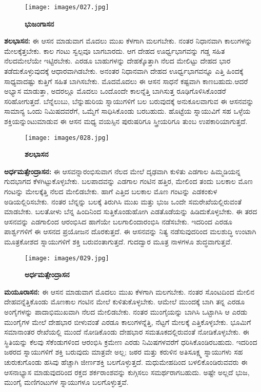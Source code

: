\begin{figure}
\texttt{[image: images/027.jpg]}
\caption{ \textbf{ಭುಜಂಗಾಸನ} }
\end{figure}

\textbf{  ಶಲಭಾಸನ:} ಈ ಆಸನ ಮಾಡುವಾಗ ಮೊದಲು ಮುಖ ಕೆಳಗಾಗಿ ಮಲಗಬೇಕು. ನಂತರ ನಿಧಾನವಾಗಿ ಕಾಲುಗಳನ್ನು ಮೇಲಕ್ಕೆತ್ತಬೇಕು. ಕಾಲ ಗಂಟು ಸ್ವಲ್ಪವೂ ಬಾಗಬಾರದು. ಆಗ ದೇಹದ ಊರ್ಧ್ವಭಾಗವನ್ನು ಗಡ್ಡ ಸಹಿತ ನೆಲದಮೇಲೆಯೇ ಇಟ್ಟಿರಬೇಕು. ಎರಡೂ ಬಾಹುಗಳನ್ನು ದೇಹಕ್ಕೊತ್ತಾಗಿ ನೆಲದ ಮೇಲಿಟ್ಟು ದೇಹದ ಭಾರ ತಡೆದುಕೊಳ್ಳುವುದಕ್ಕೆ ಆಧಾರವಾಗಿಡಬೇಕು. ಅನಂತರ ನಿಧಾನವಾಗಿ ದೇಹದ ಊರ್ಧ್ವಭಾಗವನ್ನೂ ಎತ್ತಿ ಹಿಂದಕ್ಕೆ ಸಾಧ್ಯವಾದಷ್ಟು ಕುತ್ತಿಗೆ ಸಹಿತ ಬಾಗಿಸಬೇಕು. ಮೊದಮೊದಲು ಈ ಆಸನ ಸಾಧನೆ ಕಷ್ಟವಾಗಿ ಕಾಣಬಹುದು.ಆದರೆ ಅಭ್ಯಾಸ ಮಾಡುತ್ತಾ, ಅದರಲ್ಲೂ ಮೊದಲು ಒಂದೊಂದೇ ಕಾಲನ್ನೆತ್ತಿ ಬಾಗಿಸುತ್ತ ರೂಢಿಗೊಳಿಸಿಕೊಂಡರೆ ಸರಿಹೋಗುತ್ತದೆ. ಬೆನ್ನೆಲುಬು, ಬೆನ್ನುಹುರಿಯ ಸ್ನಾಯುಗಳಿಗೆ ಬಲ ಬರುವುದಕ್ಕೆ ಅನುಕೂಲವಾಗುವ ಈ ಆಸನವನ್ನು ಸಾಮಾನ್ಯ ಒಂದು ನಿಮಿಷದವರೆಗೆ, ಒಮ್ಮೆಗೆ ಸಾಧಿಸಿಕೊಂಡು ಬರಬಹುದು. ಹೊಟ್ಟೆಯ ಸ್ನಾಯುವಿಗೆ ಸಹ ಒಳ್ಳೆಯ ಶಕ್ತಿಯನ್ನುಂಟುಮಾಡುವ ಈ ಆಸನ ಮಧ್ಯ ವಯಸ್ಸಿನ ಪುರುಷರಿಗೂ ಸ್ತ್ರೀಯರಿಗೂ ತುಂಬ ಉಪಕಾರಿಯಾಗುತ್ತದೆ.

\begin{figure}
\texttt{[image: images/028.jpg]}
\caption{ \textbf{ಶಲಭಾಸನ} }
\end{figure}

\textbf{  ಅರ್ಧಮತ್ಸೇಂದ್ರಾಸನ:} ಈ ಆಸವನ್ನಾರಂಭಿಸುವಾಗ ನೆಲದ ಮೇಲೆ ದೃಢವಾಗಿ ಕುಳಿತು ಎಡಗಾಲ ಹಿಮ್ಮಡಿಯನ್ನ ಗುದಭಾಗದ ಕೆಳಗಿಟ್ಟುಕೊಳ್ಳಬೇಕು. ಬಲಪಾದವನ್ನು ಎಡಗಾಲ ಗಂಟಿನ ಹತ್ತಿರ, ಮೇಲಿಂದ ತಂದು ಬಲಕಾಲ ಮೊಣ ಗಂಟನ್ನು ಮೇಲಕ್ಕೆತ್ತಿ ನೆಲದ ಮೇಲಿಡಬೇಕು. ಹಾಗೆ ಎತ್ತಿದ ಬಲಕಾಲ ಮೊಣ ಗಂಟನ್ನು ಎಡಕಂಕುಳ ಅಡಿಯಲ್ಲಿರಿಸಬೇಕು. ನಂತರ ಬೆನ್ನನ್ನು ಬಲಕ್ಕೆ ತಿರುಗಿಸಿ ಮುಖ ಮತ್ತು ಭುಜ ಒಂದೇ ಸಮರೇಖೆಯಲ್ಲಿರುವಂತೆ ಮಾಡಬೇಕು. ಬಲತೋಳು ಬೆನ್ನ ಹಿಂದಿನಿಂದ ಸುತ್ತಿಕೊಂಡುಹೋಗಿ ಎಡತೊಡೆಯನ್ನು ಹಿಡಿದುಕೊಳ್ಳಬೇಕು. ಈ ತರದ ಆಸನವನ್ನು ಎಡಗಾಲಿಂದ ಆರಂಭಿಸಿದ ಹಾಗೆಯೇ ಬಲಗಾಲಿಂದಾರಂಭಿಸಿ ನಡೆಸಬೇಕು. ಇದರಿಂದ ಎರಡೂ ಪಾರ್ಶ್ವಗಳಿಗೆ ಈ ಆಸನದ ಪ್ರಯೋಜನ ದೊರಕುತ್ತದೆ. ಈ ಆಸನವನ್ನು ನಿತ್ಯ ನಡೆಸುವುದರಿಂದ ಮಲಶುದ್ಧಿ ಉಂಟಾಗಿ ಮೂತ್ರಕೋಶದ ಸ್ನಾಯುಗಳಿಗೆ ಶಕ್ತಿ ಬರುವಂತಾಗುತ್ತದೆ. ಗುದದ್ವಾರ ಮೂತ್ರ ನಾಳಗಳೂ ಶುದ್ಧವಾಗುತ್ತವೆ.

\begin{figure}
\texttt{[image: images/029.jpg]}
\caption{ \textbf{ಅರ್ಧಮತ್ಸೇಂದ್ರಾಸನ} }
\end{figure}

\textbf{  ಮಯೂರಾಸನ:} ಈ ಆಸನ ಮಾಡುವಾಗ ಮೊದಲು ಮುಖ ಕೆಳಗಾಗಿ ಮಲಗಬೇಕು. ನಂತರ ಸೊಂಟದಿಂದ ಮೇಲಿನ ದೇಹವನ್ನೆತ್ತಿಕೊಂಡು ಮೊಣಕಾಲ ಗಂಟಿನ ಮೇಲೆ ಕುಳಿತುಕೊಳ್ಳಬೇಕು. ಆಮೇಲೆ ಮುಂದಕ್ಕೆ ಬಾಗಿ ತನ್ನ ಎರಡೂ ಅಂಗೈಗಳನ್ನು ಪಾದಾಭಿಮುಖವಾಗಿ ನೆಲದ ಮೇಲಿಡಬೇಕು. ನಂತರ ಮುಂಗೈಯನ್ನು ಬಾಗಿಸಿ ಒಟ್ಟಾಗಿಸಿ ಆ ಎರಡು ಮುಂಗೈಗಳ ಮೇಲೆ ದೇಹಭಾರ ಬೀಳುವಂತೆ ಎರಡೂ ಕಾಲುಗಳನ್ನೆತ್ತಿ, ನೆಟ್ಟಗೆ ಮೇಲಕ್ಕೆ ಎತ್ತಿಕೊಳ್ಳಬೇಕು. ಭೂಮಿಗೆ ಸಮಾನಾಂತರ ರೇಖೆಯಲ್ಲಿ ಮುಂದೆ ನೋಡಿಕೊಂಡು ದೇಹಭಾರ ಸಮತೂಕದಲ್ಲಿರುವಂತೆ ನೋಡಿಕೊಳ್ಳಬೇಕು. ಈ ಸ್ಥಿತಿಯನ್ನು ಕೆಲವು ಸೆಕೆಂಡುಗಳಿಂದ ಆರಂಭಿಸಿ ಕ್ರಮೇಣ ಎರಡು ನಿಮಿಷಗಳವರೆಗೆ ಧರಿಸಿಕೊಂಡಿರಬಹುದು. ಇದರಿಂದ ಜಠರದ ಸ್ನಾಯುಗಳಿಗೆ ಶಕ್ತಿ ಬರುವುದು ಮಾತ್ರವೇ ಅಲ್ಲ; ಜಠರ ಮತ್ತು ಕರುಳಿನ ಅತಿಸೂಕ್ಷ್ಮ ಸ್ನಾಯುಗಳು ಸಹ ಚುರುಕುಗೊಂಡು ಹಸಿವು ಹೆಚ್ಚಾಗಿ ಜೀರ್ಣಶಕ್ತಿ ಬಲಗೊಳ್ಳುತ್ತದೆ. ಮಧುಮೇಹದಿಂದ ಬಳಲಿಕೊಂಡಿರುವವರು ಈ ಆಸನಾಭ್ಯಾಸ ಮಾಡುವುದರಿಂದ ರಕ್ತದ ಶರ್ಕರಾಂಶವನ್ನು ಕುಗ್ಗಿಸಲು ಸಮರ್ಥರಾಗಬಹುದು. ಅಷ್ಟೇ ಅಲ್ಲದೆ ಭುಜ, ಮುಂಗೈ ಮಣಿಗಂಟುಗಳ ಸ್ನಾಯುಗಳೂ ಬಲಗೊಳ್ಳುತ್ತವೆ.

